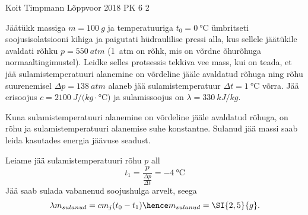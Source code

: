 {Koit Timpmann} %
{Lõppvoor} %
{2018} %
{PK 6} %
{2} %
{
\ifStatement
Jäätükk massiga $m = \SI{100}{g}$ ja temperatuuriga $t_0 = \SI{0}{\celsius}$ ümbritseti soojusisolatsiooni kihiga ja paigutati hüdraulilise pressi alla, kus sellele jäätükile avaldati rõhku $p = \SI{550}{atm}$ (\SI{1}{atm} on rõhk, mis on võrdne õhurõhuga normaaltingimustel). Leidke selles protsessis tekkiva vee mass, kui on teada, et jää sulamistemperatuuri alanemine on võrdeline jääle avaldatud rõhuga ning rõhu suurenemisel $\Delta p = \SI{138}{atm}$ alaneb jää sulamistemperatuur $\Delta t = \SI{1}{\celsius}$ võrra. Jää erisoojus $c = \SI{2100}{J/(kg\cdot\celsius})$ ja sulamissoojus on $\lambda = \SI{330}{kJ/kg}$.
\fi


\ifHint
Kuna sulamistemperatuuri alanemine on võrdeline jääle avaldatud rõhuga, on rõhu ja sulamistemperatuuri alanemise suhe konstantne. Sulanud jää massi saab leida kasutades energia jäävuse seadust.
\fi


\ifSolution
Leiame jää sulamistemperatuuri rõhu $p$ all
\[ t_1 = \frac{p}{\frac{\Delta p}{\Delta t}} = \SI{-4}{\celsius} \]
Jää saab sulada vabanenud soojushulga arvelt, seega
\[ \lambda m_{sulanud} = cm_j(t_0 - t_1) \hence m_{sulanud} = \SI{2,5}{g}. \]
\fi
}